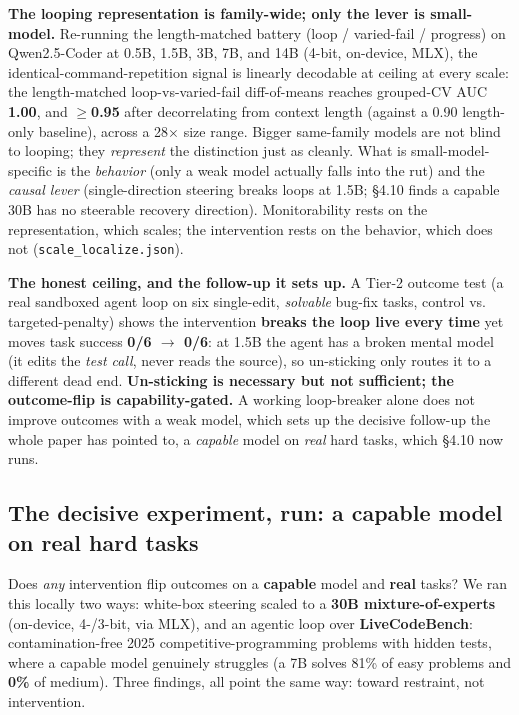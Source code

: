 \textbf{The looping representation is family-wide; only the lever is small-model.} Re-running the length-matched battery (loop / varied-fail / progress) on Qwen2.5-Coder at 0.5B, 1.5B, 3B, 7B, and 14B (4-bit, on-device, MLX), the identical-command-repetition signal is linearly decodable at ceiling at every scale: the length-matched loop-vs-varied-fail diff-of-means reaches grouped-CV AUC \textbf{1.00}, and \textbf{$\ge$0.95} after decorrelating from context length (against a 0.90 length-only baseline), across a 28$\times$ size range. Bigger same-family models are not blind to looping; they \emph{represent} the distinction just as cleanly. What is small-model-specific is the \emph{behavior} (only a weak model actually falls into the rut) and the \emph{causal lever} (single-direction steering breaks loops at 1.5B; \S4.10 finds a capable 30B has no steerable recovery direction). Monitorability rests on the representation, which scales; the intervention rests on the behavior, which does not (\texttt{scale\_localize.json}).

\textbf{The honest ceiling, and the follow-up it sets up.} A Tier-2 outcome test (a real sandboxed agent loop on six single-edit, \emph{solvable} bug-fix tasks, control vs. targeted-penalty) shows the intervention \textbf{breaks the loop live every time} yet moves task success \textbf{0/6 $\to$ 0/6}: at 1.5B the agent has a broken mental model (it edits the \emph{test call}, never reads the source), so un-sticking only routes it to a different dead end. \textbf{Un-sticking is necessary but not sufficient; the outcome-flip is capability-gated.} A working loop-breaker alone does not improve outcomes with a weak model, which sets up the decisive follow-up the whole paper has pointed to, a \emph{capable} model on \emph{real} hard tasks, which \S4.10 now runs.

\subsection{The decisive experiment, run: a capable model on real hard tasks}
Does \emph{any} intervention flip outcomes on a \textbf{capable} model and \textbf{real} tasks? We ran this locally two ways: white-box steering scaled to a \textbf{30B mixture-of-experts} (on-device, 4-/3-bit, via MLX), and an agentic loop over \textbf{LiveCodeBench}: contamination-free 2025 competitive-programming problems with hidden tests, where a capable model genuinely struggles (a 7B solves 81\% of easy problems and \textbf{0\%} of medium). Three findings, all point the same way: toward restraint, not intervention.

